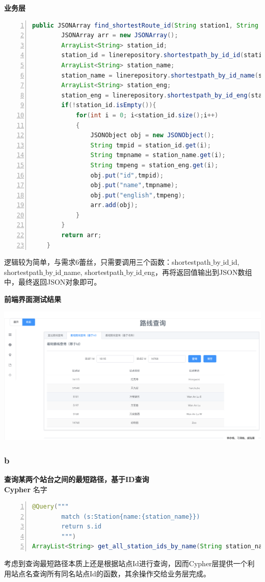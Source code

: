 \documentclass[11pt,a4paper]{article}
\begin{document}
\textbf{业务层} \\
\begin{lstlisting}[numbers = left, 
showstringspaces=false,
showspaces = false,
breaklines = true, 
language=Java]
    public JSONArray find_shortestRoute_id(String station1, String station2){
        JSONArray arr = new JSONArray();
        ArrayList<String> station_id;
        station_id = linerepository.shortestpath_by_id_id(station1, station2);
        ArrayList<String> station_name;
        station_name = linerepository.shortestpath_by_id_name(station1, station2);
        ArrayList<String> station_eng;
        station_eng = linerepository.shortestpath_by_id_eng(station1, station2);
        if(!station_id.isEmpty()){
            for(int i = 0; i<station_id.size();i++)
            {
                JSONObject obj = new JSONObject();
                String tmpid = station_id.get(i);
                String tmpname = station_name.get(i);
                String tmpeng = station_eng.get(i);
                obj.put("id",tmpid);
                obj.put("name",tmpname);
                obj.put("english",tmpeng);
                arr.add(obj);
            }
        }
        return arr;
    }
\end{lstlisting} 
逻辑较为简单，与需求6蕾丝，只需要调用三个函数：shortestpath$\_$by$\_$id$\_$id, shortestpath$\_$by$\_$id$\_$name, shortestpath$\_$by$\_$id$\_$eng，再将返回值输出到JSON数组中，最终返回JSON对象即可。

\textbf{前端界面测试结果} \\
\begin{center}
\centering
\includegraphics[scale=0.3]{./assets/demand5_1.png} 
\end{center}

\subsubsection{b}
\textbf{查询某两个站台之间的最短路径，基于ID查询} \\
\textbf{Cypher} 名字
\begin{lstlisting}[numbers = left, 
showstringspaces=false,
showspaces = false,
breaklines = true, 
language=Java]
@Query("""
        match (s:Station{name:{station_name}})
        return s.id
    	""")
ArrayList<String> get_all_station_ids_by_name(String station_name);
\end{lstlisting} 
考虑到查询最短路径本质上还是根据站点Id进行查询，因而Cypher层提供一个利用站点名查询所有同名站点Id的函数，其余操作交给业务层完成。
\end{document}

